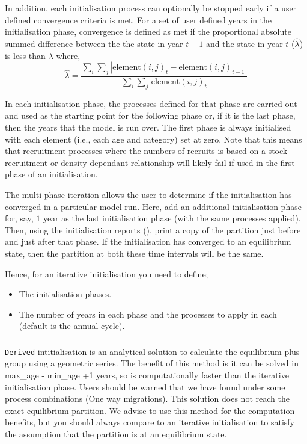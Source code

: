 In addition, each initialisation process can optionally be stopped early if a user defined convergence criteria is met. For a set of user defined years in the initialisation phase, convergence is defined as met if the proportional absolute summed difference between the the state in year $t-1$ and the state in year $t$ ($\widehat{\lambda}$) is less than $\lambda$ where, 
\begin{equation}
  \widehat{\lambda} = \frac{\sum\limits_{i} \sum\limits_{j} \left|\text{element}(i,j)_t - \text{element}(i,j)_{t-1} \right|}{\sum\limits_{i} \sum\limits_{j} \frac{}{}\text{element}(i,j)_t}
\end{equation}

In each initialisation phase, the processes defined for that phase are carried out and used as the starting point for the following phase or, if it is the last phase, then the years that the model is run over. The first phase is always initialised with each element (i.e., each age and category) set at zero. Note that this means that recruitment processes where the numbers of recruits is based on a stock recruitment or density dependant relationship will likely fail if used in the first phase of an initialisation. 

The multi-phase iteration allows the user to determine if the initialisation has converged in a particular model run. Here, add an additional initialisation phase for, say, $1$ year as the last initialisation phase (with the same processes applied). Then, using the initialisation reports (), print a copy of the partition just before and just after that phase. If the initialisation has converged to an equilibrium state, then the partition at both these time intervals will be the same.

Hence, for an iterative initialisation you need to define;
\begin{itemize}
  \item The initialisation phases.
  \item The number of years in each phase and the processes to apply in each (default is the annual cycle).
\end{itemize}
\subsubsection*{}
\texttt{Derived} intitialisation is an analytical solution to calculate the equilibrium plus group using a geometric series. The benefit of this method is it can be solved in max\_age - min\_age +1 years, so is computationally faster than the iterative initialisation phase. Users should be warned that we have found under some process combinations (One way migrations). This solution does not reach the exact equilibrium partition. We advise to use this method for the computation benefits, but you should always compare to an iterative initialisation to satisfy the assumption that the partition is at an equilibrium state.
